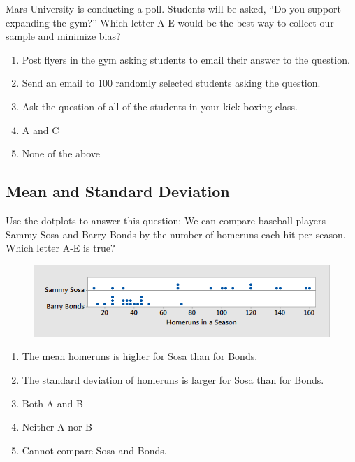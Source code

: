 \documentclass[11.5pt]{sig-alternate} %
\begin{document}
\begin{large}
Mars University is conducting a poll. Students will be asked, “Do you support expanding the gym?” Which letter A-E would be the best way to collect our sample and minimize bias?
\begin{enumerate}[label=\Alph*.]
    \item Post flyers in the gym asking students to email their answer to the question.
    \item Send an email to 100 randomly selected students asking the question.
    \item Ask the question of all of the students in your kick-boxing class.
    \item A and C
    \item None of the above
\end{enumerate}

\subsection*{Mean and Standard Deviation}

Use the dotplots to answer this question: We can compare baseball players Sammy Sosa and Barry Bonds by the number of homeruns each hit per season. Which letter A-E is true?

 \begin{figure}[!h]
     \centering
     \includegraphics[width=0.5\linewidth]{images/q1.png}
 \end{figure}
\begin{enumerate}[label=\Alph*.]
    \item The mean homeruns is higher for Sosa than for Bonds.
    \item The standard deviation of homeruns is larger for Sosa than for Bonds.
    \item Both A and B
    \item Neither A nor B
    \item Cannot compare Sosa and Bonds.
\end{enumerate}


\end{large}
\end{document}
